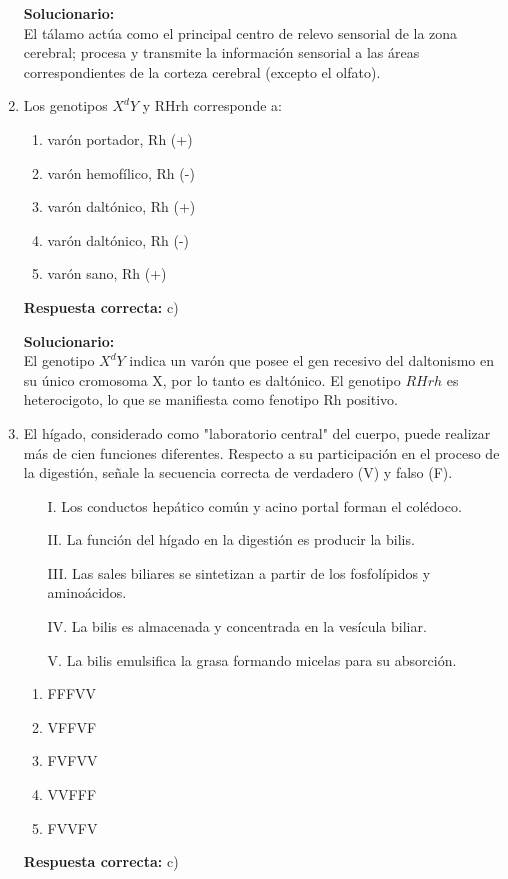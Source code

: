 \begin{enumerate}
	\vspace{2mm}
	\textbf{Solucionario:}\\
	El tálamo actúa como el principal centro de relevo sensorial de la zona cerebral; procesa y transmite la información sensorial a las áreas correspondientes de la corteza cerebral (excepto el olfato).
	
	\vspace{6mm}
	
	\item Los genotipos $X^dY$ y RHrh corresponde a:
	\begin{enumerate}[label=\alph*)]
		\item varón portador, Rh (+)
		\item varón hemofílico, Rh (-)
		\item varón daltónico, Rh (+)
		\item varón daltónico, Rh (-)
		\item varón sano, Rh (+)
	\end{enumerate}
	\textbf{Respuesta correcta:} c)
	
	\vspace{2mm}
	\textbf{Solucionario:}\\
	El genotipo $X^dY$ indica un varón que posee el gen recesivo del daltonismo en su único cromosoma X, por lo tanto es daltónico. El genotipo $RHrh$ es heterocigoto, lo que se manifiesta como fenotipo Rh positivo.
	
	\vspace{6mm}
	
	\item El hígado, considerado como "laboratorio central" del cuerpo, puede realizar más de cien funciones diferentes. Respecto a su participación en el proceso de la digestión, señale la secuencia correcta de verdadero (V) y falso (F).
	\begin{itemize}
		\item[I.] Los conductos hepático común y acino portal forman el colédoco.
		\item[II.] La función del hígado en la digestión es producir la bilis.
		\item[III.] Las sales biliares se sintetizan a partir de los fosfolípidos y aminoácidos.
		\item[IV.] La bilis es almacenada y concentrada en la vesícula biliar.
		\item[V.] La bilis emulsifica la grasa formando micelas para su absorción.
	\end{itemize}
	\begin{enumerate}[label=\alph*)]
		\item FFFVV
		\item VFFVF
		\item FVFVV
		\item VVFFF
		\item FVVFV
	\end{enumerate}
	\textbf{Respuesta correcta:} c)
	

\end{enumerate}
